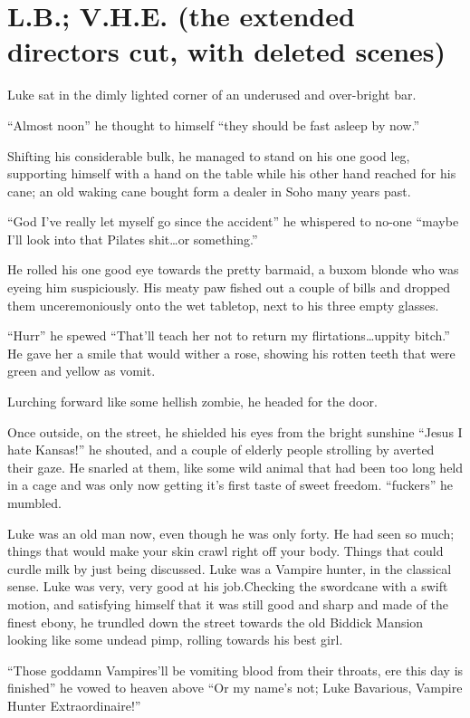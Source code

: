 \chapter[L.B.; V.H.E.]{L.B.; V.H.E. (the extended directors cut, with deleted scenes)}


Luke sat in the dimly lighted corner of an underused and
over-bright bar.

``Almost noon'' he thought to himself ``they should be fast asleep by
now.''

Shifting his considerable bulk, he managed to stand on his one good
leg, supporting himself with a hand on the table while his other
hand reached for his cane; an old waking cane bought form a dealer
in Soho many years past.

``God I've really let myself go since the accident'' he whispered to
no-one ``maybe I'll look into that Pilates shit{\ldots}or
something.''

He rolled his one good eye towards the pretty barmaid, a buxom
blonde who was eyeing him suspiciously. His meaty paw fished out a
couple of bills and dropped them unceremoniously onto the wet
tabletop, next to his three empty glasses.

``Hurr'' he spewed ``That'll teach her not to return my
flirtations{\ldots}uppity bitch.'' He gave her a smile that would wither
a rose, showing his rotten teeth that were green and yellow as
vomit.

Lurching forward like some hellish zombie, he headed for the
door.

Once outside, on the street, he shielded his eyes from the bright
sunshine ``Jesus I hate Kansas!'' he shouted, and a couple of elderly
people strolling by averted their gaze. He snarled at them, like
some wild animal that had been too long held in a cage and was only
now getting it's first taste of sweet freedom. ``fuckers'' he
mumbled.

Luke was an old man now, even though he was only forty. He had seen
so much; things that would make your skin crawl right off your
body. Things that could curdle milk by just being discussed. Luke
was a Vampire hunter, in the classical sense. Luke was very, very
good at his job.Checking the swordcane with a swift motion, and
satisfying himself that it was still good and sharp and made of the
finest ebony, he trundled down the street towards the old Biddick
Mansion looking like some undead pimp, rolling towards his best
girl.

``Those goddamn Vampires'll be vomiting blood from their throats,
ere this day is finished'' he vowed to heaven above ``Or my name's
not; Luke Bavarious, Vampire Hunter Extraordinaire!''


